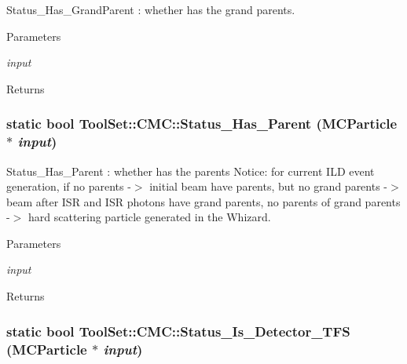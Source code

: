 Status\_\-Has\_\-GrandParent : whether has the grand parents. 
\begin{DoxyParams}{Parameters}
\item[{\em input}]\end{DoxyParams}
\begin{DoxyReturn}{Returns}

\end{DoxyReturn}
\hypertarget{classToolSet_1_1CMC_acd1cf4b7527b2e2bd194ad688b29b132}{
\subsubsection[{Status\_\-Has\_\-Parent}]{\setlength{\rightskip}{0pt plus 5cm}static bool ToolSet::CMC::Status\_\-Has\_\-Parent (MCParticle $\ast$ {\em input})}}
\label{classToolSet_1_1CMC_acd1cf4b7527b2e2bd194ad688b29b132}


Status\_\-Has\_\-Parent : whether has the parents Notice: for current ILD event generation, if no parents -\/$>$ initial beam have parents, but no grand parents -\/$>$ beam after ISR and ISR photons have grand parents, no parents of grand parents -\/$>$ hard scattering particle generated in the Whizard. 
\begin{DoxyParams}{Parameters}
\item[{\em input}]\end{DoxyParams}
\begin{DoxyReturn}{Returns}

\end{DoxyReturn}
\hypertarget{classToolSet_1_1CMC_a23a38c3094037dd6660223494c8a5827}{
\subsubsection[{Status\_\-Is\_\-Detector\_\-TFS}]{\setlength{\rightskip}{0pt plus 5cm}static bool ToolSet::CMC::Status\_\-Is\_\-Detector\_\-TFS (MCParticle $\ast$ {\em input})}}
\label{classToolSet_1_1CMC_a23a38c3094037dd6660223494c8a5827}


